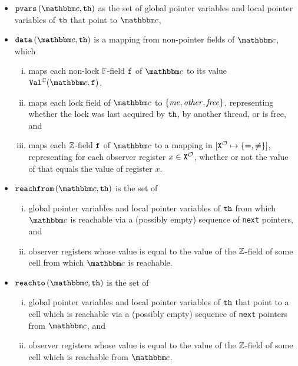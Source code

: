 \begin{itemize}
\item
  $\pvarsofth{\cell}{\thread}$ as the set of global pointer variables and
  local pointer variables of ${\tt th}$ that point to $\cell$,
\item
  $\valsofth{\cell}{\thread}$ is a mapping from non-pointer fields of $\cell$, which
  \begin{enumerate}[(i)]
    \item
    maps each non-lock $\mathbb{F}$-field $\mathtt{f}$ of $\cell$ to its value
    $\cellval(\cell,\field)$,
  \item
    maps each  lock field of $\cell$
    to $\left\{\mathit{me},\mathit{other},\mathit{free}\right\}$,
  representing whether the lock was last acquired by ${\tt th}$, by
  another thread, or is free,
  and
\item
  maps each ${\mathbb Z}$-field $\mathtt{f}$ of $\cell$ to a mapping in
  $[{\tt X}^{{\mathcal O}} \mapsto{\left\{=,\neq\right\}}]$, representing for
  each observer register $x  \in {\tt X}^{{\mathcal O}}$, whether or not the value
  of that equals the value of register $x$.
  \end{enumerate}
\item
  $\reachfromofth{\cell}{\thread}$ is the set of
  \begin{enumerate}[(i)]
  \item global pointer variables and local pointer variables of ${\tt th}$
    from which $\cell$ is reachable via a (possibly empty)
  sequence of {\tt next} pointers, and
\item observer registers whose value is equal to the value of the ${\mathbb Z}$-field of some cell from which $\cell$ is reachable.
  \end{enumerate}
\item
  $\reachtoofth{\cell}{\thread}$ is the set of
  \begin{enumerate}[(i)]
  \item global pointer variables and local pointer variables of ${\tt th}$
    that point to a cell which is reachable via a (possibly empty)
  sequence of {\tt next} pointers from $\cell$, and
  \item observer registers whose value is equal to the value of the ${\mathbb Z}$-field of some cell which is reachable from $\cell$.
  \end{enumerate}
\end{itemize}
